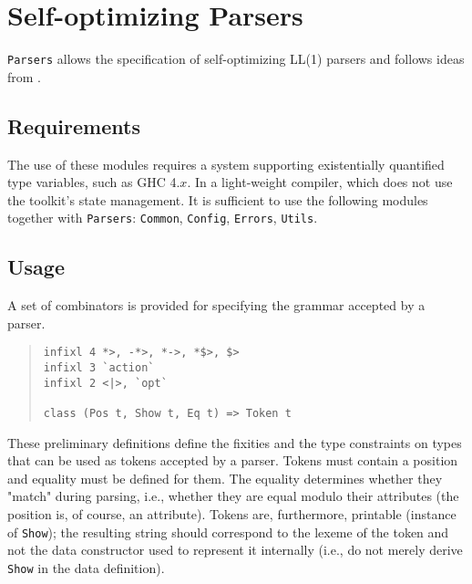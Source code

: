 \documentclass{report}
\newcommand{\code}[1]{\texttt{#1}}
\begin{document}
\section{Self-optimizing Parsers}

\code{Parsers} allows the specification of self-optimizing LL(1) parsers and
follows ideas from .

\subsection{Requirements}

The use of these modules requires a system supporting existentially quantified
type variables, such as GHC 4.$x$.  In a light-weight compiler, which does not
use the toolkit's state management.  It is sufficient to use the following
modules together with \code{Parsers}: \code{Common}, \code{Config},
\code{Errors}, \code{Utils}.

\subsection{Usage}

A set of combinators is provided for specifying the grammar accepted by a
parser. 
%
\begin{quote}
\begin{verbatim}
infixl 4 *>, -*>, *->, *$>, $>
infixl 3 `action`
infixl 2 <|>, `opt`

class (Pos t, Show t, Eq t) => Token t
\end{verbatim}
\end{quote}
%
These preliminary definitions define the fixities and the type constraints on
types that can be used as tokens accepted by a parser.  Tokens must contain a
position and equality must be defined for them.  The equality determines
whether they "match" during parsing, i.e., whether they are equal modulo their
attributes (the position is, of course, an attribute).  Tokens are,
furthermore, printable (instance of \code{Show}); the resulting string should
correspond to the lexeme of the token and not the data constructor used to
represent it internally (i.e., do not merely derive \code{Show} in the data
definition). 
\end{document}
